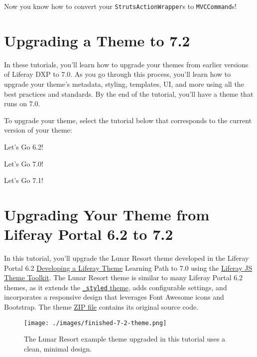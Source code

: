 Now you know how to convert your \texttt{StrutsActionWrapper}s to
\texttt{MVCCommand}s!

\chapter{Upgrading a Theme to 7.2}\label{upgrading-a-theme-to-7.2}

In these tutorials, you'll learn how to upgrade your themes from earlier
versions of Liferay DXP to 7.0. As you go through this process, you'll
learn how to upgrade your theme's metadata, styling, templates, UI, and
more using all the best practices and standards. By the end of the
tutorial, you'll have a theme that runs on 7.0.

To upgrade your theme, select the tutorial below that corresponds to the
current version of your theme:

Let's Go 6.2!{}

Let's Go 7.0!{}

Let's Go 7.1!{}

\chapter{Upgrading Your Theme from Liferay Portal 6.2 to
7.2}\label{upgrading-your-theme-from-liferay-portal-6.2-to-7.2}

In this tutorial, you'll upgrade the Lunar Resort theme developed in the
Liferay Portal 6.2
\href{/docs/6-2/tutorials/-/knowledge_base/t/developing-a-liferay-theme}{Developing
a Liferay Theme} Learning Path to 7.0 using the
\href{https://github.com/liferay/liferay-js-themes-toolkit/tree/master/packages}{Liferay
JS Theme Toolkit}. The Lunar Resort theme is similar to many Liferay
Portal 6.2 themes, as it extends the
\href{https://github.com/liferay/liferay-portal/tree/6.2.x/portal-web/docroot/html/themes/_styled}{\texttt{\_styled}
theme}, adds configurable settings, and incorporates a responsive design
that leverages Font Awesome icons and Bootstrap. The theme
\href{https://github.com/liferay/liferay-docs/blob/7.0.x/develop/tutorials/code/upgrading-themes/lunar-resort-theme-migration-6.2.zip}{ZIP
file} contains its original source code.

\begin{figure}
\centering
\texttt{[image: ./images/finished-7-2-theme.png]}
\caption{The Lunar Resort example theme upgraded in this tutorial uses a
clean, minimal design.}
\end{figure}

